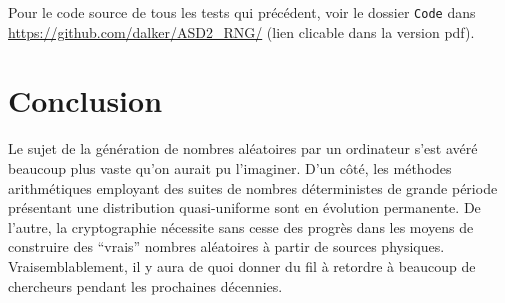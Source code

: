 \documentclass{scrartcl}
\begin{document}
Pour le code source de tous les tests qui précédent, voir le dossier
\texttt{Code} dans \url{https://github.com/dalker/ASD2_RNG/} (lien clicable dans
la version pdf).

\section{Conclusion}
Le sujet de la génération de nombres aléatoires par un ordinateur s'est avéré
beaucoup plus vaste qu'on aurait pu l'imaginer. D'un côté, les méthodes
arithmétiques employant des suites de nombres déterministes de grande période
présentant une distribution quasi-uniforme sont en évolution permanente. De
l'autre, la cryptographie nécessite sans cesse des progrès dans les moyens de
construire des ``vrais'' nombres aléatoires à partir de sources
physiques. Vraisemblablement, il y aura de quoi donner du fil à retordre à
beaucoup de chercheurs pendant les prochaines décennies.

\printbibliography
\end{document}
